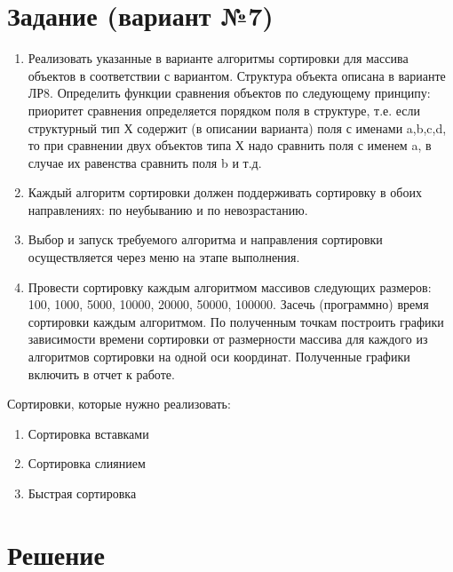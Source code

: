 \documentclass[12pt]{article}
\begin{document}
\section*{Задание (вариант №7)}
\begin{enumerate}
	\item Реализовать указанные в варианте алгоритмы сортировки для массива объектов в  соответствии с вариантом. Структура объекта описана в варианте ЛР8. Определить функции сравнения объектов по следующему принципу: приоритет сравнения определяется порядком поля в структуре, т.е. если структурный тип Х содержит (в описании варианта) поля с именами a,b,c,d, то при сравнении двух объектов типа Х надо сравнить поля с именем a, в случае их равенства сравнить поля b и т.д.
	\item Каждый алгоритм сортировки должен поддерживать сортировку в обоих направлениях: по неубыванию и по невозрастанию.
	\item Выбор и запуск требуемого алгоритма и направления сортировки осуществляется через меню на этапе выполнения.
	\item Провести сортировку каждым алгоритмом массивов следующих размеров: 100, 1000, 5000, 10000, 20000, 50000, 100000. Засечь (программно) время сортировки  каждым алгоритмом. По полученным точкам построить графики зависимости времени сортировки от размерности массива для каждого из алгоритмов сортировки на одной оси координат. Полученные графики включить в отчет к работе.
\end{enumerate}

Сортировки, которые нужно реализовать:
\begin{enumerate}
\item Сортировка вставками
\item Сортировка слиянием
\item Быстрая сортировка
\end{enumerate}


\newpage


\section*{Решение}
\end{document}

